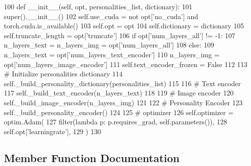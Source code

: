 \begin{DoxyCode}
100     \textcolor{keyword}{def }\_\_init\_\_(self, opt, personalities\_list, dictionary):
101         super().\_\_init\_\_()
102         self.use\_cuda = \textcolor{keywordflow}{not} opt[\textcolor{stringliteral}{'no\_cuda'}] \textcolor{keywordflow}{and} torch.cuda.is\_available()
103         self.opt = opt
104         self.dictionary = dictionary
105         self.truncate\_length = opt[\textcolor{stringliteral}{'truncate'}]
106         \textcolor{keywordflow}{if} opt[\textcolor{stringliteral}{'num\_layers\_all'}] != -1:
107             n\_layers\_text = n\_layers\_img = opt[\textcolor{stringliteral}{'num\_layers\_all'}]
108         \textcolor{keywordflow}{else}:
109             n\_layers\_text = opt[\textcolor{stringliteral}{'num\_layers\_text\_encoder'}]
110             n\_layers\_img = opt[\textcolor{stringliteral}{'num\_layers\_image\_encoder'}]
111         self.text\_encoder\_frozen = \textcolor{keyword}{False}
112 
113         \textcolor{comment}{# Initialize personalities dictionary}
114         self.\_build\_personality\_dictionary(personalities\_list)
115 
116         \textcolor{comment}{# Text encoder}
117         self.\_build\_text\_encoder(n\_layers\_text)
118 
119         \textcolor{comment}{# Image encoder}
120         self.\_build\_image\_encoder(n\_layers\_img)
121 
122         \textcolor{comment}{# Personality Encoder}
123         self.\_build\_personality\_encoder()
124 
125         \textcolor{comment}{# optimizer}
126         self.optimizer = optim.Adam(
127             filter(\textcolor{keyword}{lambda} p: p.requires\_grad, self.parameters()),
128             self.opt[\textcolor{stringliteral}{'learningrate'}],
129         )
130 
\end{DoxyCode}


\subsection{Member Function Documentation}
\mbox{\label{classprojects_1_1personality__captions_1_1transresnet_1_1modules_1_1TransresnetModel_a5d403cea2bcc3d1989bbd00c5d824d01}} 

